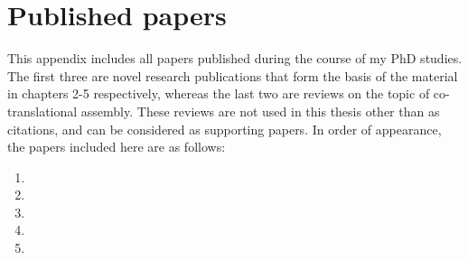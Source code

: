 \documentclass[a4paper,11pt,twoside,openright]{scrbook}
\begin{document}
\clearpage

\section{Published papers}\label{appendix:published} This appendix includes all
papers published during the course of my PhD studies. The first three are novel
research publications that form the basis of the material in chapters 2-5
respectively, whereas the last two are reviews on the topic of co-translational
assembly. These reviews are not used in this thesis other than as citations, and
can be considered as supporting papers. In order of appearance, the papers
included here are as follows:

\begin{enumerate} \item{} \item{}
\item{} \item{}
\item{} \end{enumerate}

\newpage\null\thispagestyle{empty}\newpage

\newpage\null\thispagestyle{empty}\newpage

\newpage\null\thispagestyle{empty}\newpage


\newpage\null\thispagestyle{empty}\newpage

\end{document}
